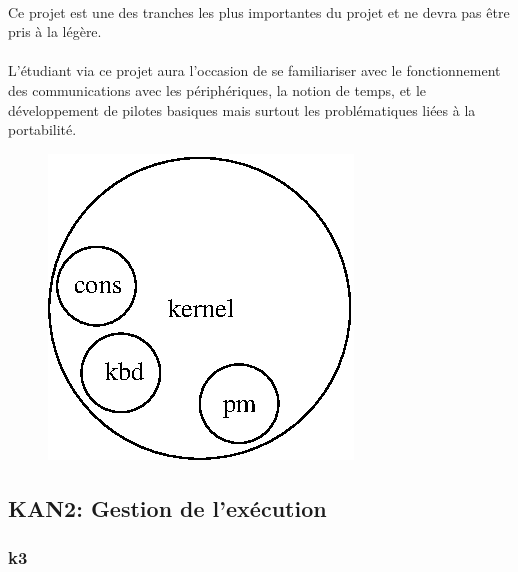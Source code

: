 \documentclass[10pt,a4wide]{article}
\begin{document}
\paragraph{}

Ce projet est une des tranches les plus importantes du projet et ne devra
pas \^etre pris \`a la l\'eg\`ere.

\paragraph{}

L'\'etudiant via ce projet aura l'occasion de se familiariser avec le
fonctionnement des communications avec les p\'eriph\'eriques, la notion de
temps, et le d\'eveloppement de pilotes basiques mais surtout les
probl\'ematiques li\'ees \`a la portabilit\'e.

\vspace{5cm}

\begin{figure}[h]
\centerline{\includegraphics{figures/k2.eps}}
\end{figure}

\newpage

\subsection{KAN2: Gestion de l'ex\'ecution}

\paragraph{}

\subsubsection{k3}
\end{document}
